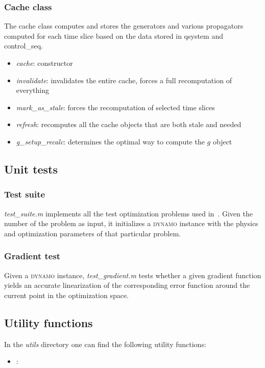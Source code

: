 \documentclass[aps, pra, a4paper, longbibliography, superscriptaddress]{revtex4-1}
\newcommand{\DYNAMO}{\textsc{dynamo}}
\begin{document}
\subsubsection{Cache class}

The cache class computes and stores the generators and various propagators computed
for each time slice based on the data stored in qsystem and control\_seq.

\begin{itemize}
\item
\emph{cache}: constructor
\item
\emph{invalidate}:
invalidates the entire cache, forces a full recomputation of everything
\item
\emph{mark\_as\_stale}:
forces the recomputation of selected time slices
\item
\emph{refresh}:
recomputes all the cache objects that are both stale and needed
\item
\emph{g\_setup\_recalc}:
determines the optimal way to compute the $g$ object
\end{itemize}


\subsection{Unit tests}

\subsubsection{Test suite}
\emph{test\_suite.m} implements all the test optimization problems used in~\cite{machnes_2011}.
Given the number of the problem as input, it initializes a \DYNAMO{}
instance with the physics and optimization parameters of that particular problem.

\subsubsection{Gradient test}
Given a \DYNAMO{} instance, \emph{test\_gradient.m} tests whether a
given gradient function yields an accurate linearization of the
corresponding error function around the current point in the
optimization space.


\subsection{Utility functions}
In the \emph{utils} directory one can find the following utility functions:
\begin{itemize}
\item
\emph{}:
\end{itemize}
\end{document}

